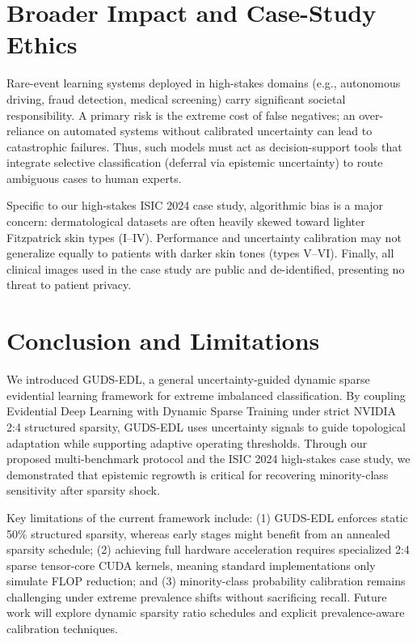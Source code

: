 \documentclass[letterpaper]{article} %
\begin{document}

\section{Broader Impact and Case-Study Ethics}
Rare-event learning systems deployed in high-stakes domains (e.g., autonomous driving, fraud detection, medical screening) carry significant societal responsibility. A primary risk is the extreme cost of false negatives; an over-reliance on automated systems without calibrated uncertainty can lead to catastrophic failures. Thus, such models must act as decision-support tools that integrate selective classification (deferral via epistemic uncertainty) to route ambiguous cases to human experts. 

Specific to our high-stakes ISIC 2024 case study, algorithmic bias is a major concern: dermatological datasets are often heavily skewed toward lighter Fitzpatrick skin types (I--IV). Performance and uncertainty calibration may not generalize equally to patients with darker skin tones (types V--VI). Finally, all clinical images used in the case study are public and de-identified, presenting no threat to patient privacy.

\section{Conclusion and Limitations}\label{sec:conclusion}
We introduced GUDS-EDL, a general uncertainty-guided dynamic sparse evidential learning framework for extreme imbalanced classification. By coupling Evidential Deep Learning with Dynamic Sparse Training under strict NVIDIA 2:4 structured sparsity, GUDS-EDL uses uncertainty signals to guide topological adaptation while supporting adaptive operating thresholds. Through our proposed multi-benchmark protocol and the ISIC 2024 high-stakes case study, we demonstrated that epistemic regrowth is critical for recovering minority-class sensitivity after sparsity shock.

Key limitations of the current framework include: (1) GUDS-EDL enforces static 50\% structured sparsity, whereas early stages might benefit from an annealed sparsity schedule; (2) achieving full hardware acceleration requires specialized 2:4 sparse tensor-core CUDA kernels, meaning standard implementations only simulate FLOP reduction; and (3) minority-class probability calibration remains challenging under extreme prevalence shifts without sacrificing recall. Future work will explore dynamic sparsity ratio schedules and explicit prevalence-aware calibration techniques.
\end{document}
